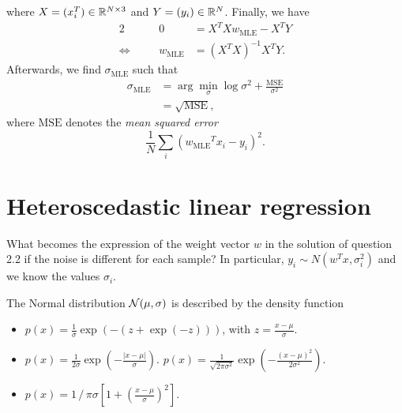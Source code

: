 \documentclass[11pt, a4paper]{article}
\begin{document}
\begin{enumerate}
\begin{solution}
        where $X = (x_i^T) \in \mathbb{R}^{N \times 3}$ and $Y = (y_i) \in \mathbb{R}^{N}$. Finally, we have
        \begin{alignat*}{2}
            && 0 & = X^T X w_{\text{MLE}} - X^T Y \\
            \Leftrightarrow \quad && w_{\text{MLE}} & = (X^T X)^{-1} X^T Y .
        \end{alignat*}
        Afterwards, we find $\sigma_{\text{MLE}}$ such that
        \begin{align*}
            \sigma_{\text{MLE}} & = \arg \min_\sigma \log \sigma^2 + \frac{\text{MSE}}{\sigma^2} \\
            & = \sqrt{\text{MSE}},
        \end{align*}
        where $\text{MSE}$ denotes the \emph{mean squared error}
        \begin{equation*}
            \frac{1}{N} \sum_i ({w_{\text{MLE}}}^T x_i - y_i)^2 .
        \end{equation*}
    \end{solution}
\end{enumerate}

\newpage

\section{Heteroscedastic linear regression}

What becomes the expression of the weight vector $w$ in the solution of question 2.2 if the noise is different for each sample? In particular, $y_i \sim N(w^T x, \sigma_i^2)$ and we know the values $\sigma_i$.

\newpage

\startquiz

The Normal distribution ${\cal N}(\mu,\sigma)$ is described by the density function
\begin{itemize}
\item $p(x) = \frac{1}{\sigma} \exp\left(-(z+\exp(-z))\right)$, with $z = \frac{x-\mu}{\sigma}$.
\item $p(x) = \frac{1}{2\sigma} \exp\left(-\frac{|x-\mu|}{\sigma}\right)$.
\solitem $p(x) = \frac{1}{\sqrt{2\pi\sigma^2}} \exp\left(-\frac{(x-\mu)^2}{2\sigma^2}\right)$.
\item $p(x) = 1 \,/\, \pi\sigma \left[1 + \left(\frac{x-\mu}{\sigma}\right)^2\right]$.
\end{itemize}
\end{document}
